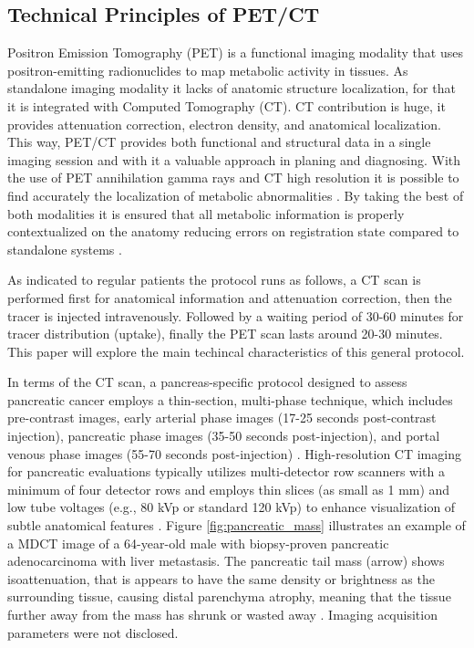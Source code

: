 \begin{multicols}{2}

\subsection{Technical Principles of PET/CT}


Positron Emission Tomography (PET) is a functional imaging modality that uses positron-emitting radionuclides to map metabolic activity in tissues. As standalone imaging modality it lacks of anatomic structure localization, for that it is integrated with Computed Tomography (CT). CT contribution is huge, it provides attenuation correction, electron density, and anatomical localization. This way, PET/CT provides both functional and structural data in a single imaging session and with it a valuable approach in planing and diagnosing. With the use of PET annihilation gamma rays and CT high resolution it is possible to find accurately the localization of metabolic abnormalities \cite{TG174}. By taking the best of both modalities it is ensured that all metabolic information is properly contextualized on the anatomy reducing errors on registration state compared to standalone systems \cite{TG126}.

As indicated to regular patients the protocol runs as follows, a CT scan is performed first for anatomical information and attenuation correction, then the tracer is injected intravenously. Followed by a waiting period of 30-60 minutes for tracer distribution (uptake), finally the PET scan lasts around 20-30 minutes. This paper will explore the main techincal characteristics of this general protocol.


In terms of the CT scan, a pancreas-specific protocol designed to assess pancreatic cancer employs a thin-section, multi-phase technique, which includes pre-contrast images, early arterial phase images (17-25 seconds post-contrast injection), pancreatic phase images (35-50 seconds post-injection), and portal venous phase images (55-70 seconds post-injection) \cite{Lee2014}. High-resolution CT imaging for pancreatic evaluations typically utilizes multi-detector row scanners with a minimum of four detector rows and employs thin slices (as small as 1 mm) and low tube voltages (e.g., 80 kVp or standard 120 kVp) to enhance visualization of subtle anatomical features \cite{Lee2023}. Figure \ref{fig:pancreatic_mass} illustrates an example of a MDCT image of a 64-year-old male with biopsy-proven pancreatic adenocarcinoma with liver metastasis. The pancreatic tail mass (arrow) shows isoattenuation, that is appears to have the same density or brightness as the surrounding tissue, causing distal parenchyma atrophy, meaning that the tissue further away from the mass has shrunk or wasted away \cite{Lee2014}. Imaging acquisition parameters were not disclosed.



\end{multicols}
